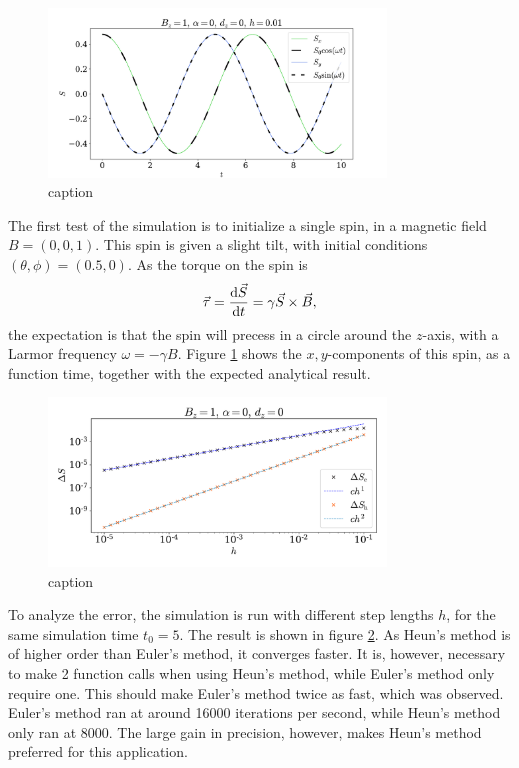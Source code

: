 \documentclass{article}
\begin{document}
    \begin{figure}
        \centering
        \includegraphics[width=0.8\textwidth]{../plots/single.pdf}
        \caption{caption}
        \label{single spin}
    \end{figure}
    The first test of the simulation is to initialize a single spin, in a magnetic field $B = (0, 0, 1)$. This spin is given a slight tilt, with initial conditions $(\theta, \phi) = (0.5, 0)$. As the torque on the spin is 
    \begin{equation*}
        \vec \tau = \dv{\vec S}{t} = \gamma \vec{S} \times \vec{B},
    \end{equation*}
    the expectation is that the spin will precess in a circle around the $z$-axis, with a Larmor frequency $\omega = -\gamma B$. Figure \ref{single spin} shows the $x,y$-components of this spin, as a function time, together with the expected analytical result.

    \begin{figure}
        \centering
        \includegraphics[width=0.8\textwidth]{../plots/err.pdf}
        \caption{caption}
        \label{error}
    \end{figure}

    
    To analyze the error, the simulation is run with different step lengths $h$, for the same simulation time $t_0 = 5$. The result is shown in figure \ref{error}. As Heun's method is of higher order than Euler's method, it converges faster. It is, however, necessary to make 2 function calls when using Heun's method, while Euler's method only require one. This should make Euler's method twice as fast, which was observed. Euler's method ran at around 16000 iterations per second, while Heun's method only ran at 8000. The large gain in precision, however, makes Heun's method preferred for this application. 
\end{document}
